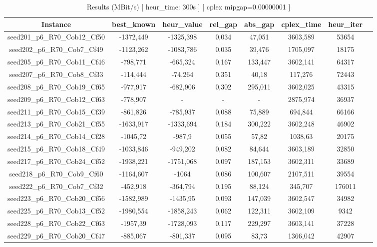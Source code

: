 \documentclass[a4paper]{article}
\begin{document}
\begin{center}
\begin{longtable}{cccccccc}
\caption{Results (MBit/s) [ heur\_time: 300s ]  [ cplex mipgap=0.00000001 ]}
\tabularnewline
\hline
Instance & best\_known & heur\_value & rel\_gap & abs\_gap & cplex\_time & heur\_iter\\
\hline
seed201\_p6\_R70\_Cob12\_Cf50 & -1372,449 & -1325,398 & 0,034 & 47,051 & 3603,589 & 53654\\
\hline
seed202\_p6\_R70\_Cob7\_Cf49 & -1123,262 & -1083,786 & 0,035 & 39,476 & 1705,097 & 18175\\
\hline
seed205\_p6\_R70\_Cob11\_Cf46 & -798,771 & -665,324 & 0,167 & 133,447 & 3602,141 & 64317\\
\hline
seed207\_p6\_R70\_Cob8\_Cf33 & -114,444 & -74,264 & 0,351 & 40,18 & 117,276 & 72443\\
\hline
seed208\_p6\_R70\_Cob19\_Cf65 & -977,917 & -682,906 & 0,302 & 295,011 & 3602,025 & 43315\\
\hline
seed209\_p6\_R70\_Cob12\_Cf63 & -778,907 & - & - & - & 2875,974 & 36937\\
\hline
seed211\_p6\_R70\_Cob15\_Cf39 & -861,826 & -785,937 & 0,088 & 75,889 & 694,844 & 66166\\
\hline
seed213\_p6\_R70\_Cob21\_Cf55 & -1633,917 & -1333,694 & 0,184 & 300,222 & 3602,248 & 46902\\
\hline
seed214\_p6\_R70\_Cob14\_Cf28 & -1045,72 & -987,9 & 0,055 & 57,82 & 1038,63 & 20175\\
\hline
seed215\_p6\_R70\_Cob18\_Cf49 & -1033,846 & -949,202 & 0,082 & 84,644 & 3603,189 & 32850\\
\hline
seed217\_p6\_R70\_Cob24\_Cf52 & -1938,221 & -1751,068 & 0,097 & 187,153 & 3602,311 & 33689\\
\hline
seed218\_p6\_R70\_Cob9\_Cf60 & -1164,607 & -1064 & 0,086 & 100,607 & 2107,511 & 39554\\
\hline
seed222\_p6\_R70\_Cob7\_Cf32 & -452,918 & -364,794 & 0,195 & 88,124 & 345,707 & 176011\\
\hline
seed223\_p6\_R70\_Cob20\_Cf56 & -1582,989 & -1435,95 & 0,093 & 147,039 & 3602,547 & 34982\\
\hline
seed225\_p6\_R70\_Cob13\_Cf52 & -1980,554 & -1858,243 & 0,062 & 122,311 & 3602,109 & 9342\\
\hline
seed228\_p6\_R70\_Cob22\_Cf63 & -1957,39 & -1728,093 & 0,117 & 229,297 & 3603,141 & 37228\\
\hline
seed229\_p6\_R70\_Cob20\_Cf47 & -885,067 & -801,337 & 0,095 & 83,73 & 1366,042 & 42907\\

\end{longtable}
\end{center}
\end{document}
